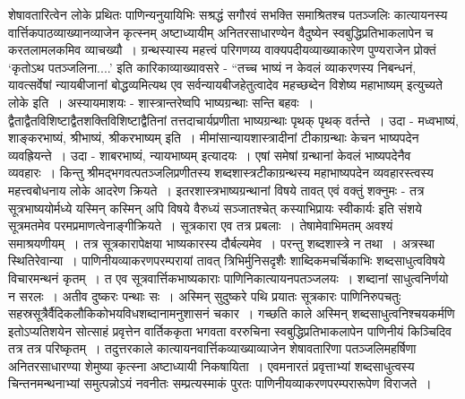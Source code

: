 {शेषावतारित्वेन लोके प्रथितः पाणिन्यनुयायिभिः सश्रद्धं सगौरवं सभक्ति समाश्रितश्च \-पतञ्जलिः कात्यायनस्य वार्त्तिकपाठव्याख्यानव्याजेन कृत्स्नम् अष्टाध्यायीम् अनितरसाधारण्येन \break वैदुष्येन स्वबुद्धिप्रतिभाकलापेन च करतलामलकमिव व्याचख्यौ~। ग्रन्थस्यास्य महत्त्वं परि\-गणय्य वाक्यपदीयव्याख्याकारेण पुण्यराजेन प्रोक्तं ‘कृतोऽथ पतञ्जलिना....’ इति कारिकाव्याख्यावसरे - “तच्च भाष्यं न केवलं व्याकरणस्य निबन्धनं, यावत्सर्वेषां न्यायबीजानां \-बोद्धव्यमित्यथ एव सर्वन्यायबीजहेतुत्वादेव महच्छब्देन विशेष्य महाभाष्यम् इत्युच्यते लोके इति~। अस्यायमाशयः - शास्त्रान्तरेष्वपि भाष्यग्रन्थाः सन्ति बहवः~। द्वैताद्वैतविशिष्टाद्वैत\-शक्तिविशिष्टाद्वैतिनां तत्तदाचार्यप्रणीता भाष्यग्रन्थाः पृथक् पृथक् वर्तन्ते~। उदा - मध्व\-भाष्यं, शाङ्करभाष्यं, श्रीभाष्यं, श्रीकरभाष्यम् इति~। मीमांसान्यायशास्त्रादीनां टीकाग्रन्थाः केचन \-भाष्यपदेन व्यवह्रियन्ते~। उदा - शाबरभाष्यं, न्यायभाष्यम् इत्यादयः~। एषां समेषां ग्रन्थानां केवलं भाष्यपदेनैव व्यवहारः~। किन्तु श्रीमद्भगवत्पतञ्जलिप्रणीतस्य शब्दशास्त्रटीकाग्रन्थस्य महाभाष्यपदेन व्यवहारस्त्वस्य महत्त्वबोधनाय लोके आदरेण क्रियते~। इतरशास्त्रभाष्य\-ग्रन्थानां विषये तावत् एवं वक्तुं शक्नुमः - तत्र सूत्रभाष्ययोर्मध्ये यस्मिन् कस्मिन् अपि विषये वैरुध्यं सञ्जातश्चेत् कस्याभिप्रायः स्वीकार्यः इति संशये सूत्रमतमेव परमप्रमाणत्वेनाङ्गीक्रियते~। सूत्र\-कारा एव तत्र प्रबलाः~। तेषामेवाभिमतम् अवश्यं समाश्रयणीयम्~। तत्र सूत्रकारापेक्षया \break भाष्यकारस्य दौर्बल्यमेव~। परन्तु शब्दशास्त्रे न तथा~। अत्रस्था स्थितिरेवान्या~। पाणिनीयव्याकरणपरम्परायां तावत् त्रिभिर्मुनिसदृशैः शाब्दिकमचर्चिकाभिः शब्दसाधुत्वविषये विचा\-रमन्थनं कृतम्~। त एव सूत्रवार्त्तिकभाष्यकाराः पाणिनिकात्यायनपतञ्जलयः~। शब्दानां \-साधुत्वनिर्णयो न सरलः~। अतीव दुष्करः पन्थाः सः~। अस्मिन् सुदुष्करे पथि प्रयातः \-सूत्रकारः पाणिनिरुपचतुः सहस्रसूत्रैर्वैदिकलौकिकोभयविधशब्दानामनुशासनं चकार~। गच्छति काले अस्मिन् शब्दसाधुत्वनिश्चयकर्मणि इतोऽप्यतिशयेन सोत्साहं प्रवृत्तेन वार्तिककृता भगवता वररुचिना स्वबुद्धिप्रतिभाकलापेन पाणिनीयं किञ्चिदिव तत्र तत्र परिष्कृतम्~। तदुत्तरकाले कात्यायनवार्त्तिकव्याख्याव्याजेन शेषावतारिणा पतञ्जलिमहर्षिणा अनितरसाधारण्या शेमुष्या कृत्स्ना अष्टाध्यायी निकषायिता~। एवमनारतं प्रवृत्ताभ्यां शब्दसाधुत्वस्य चिन्तनमन्थनाभ्यां समुत्पन्नोऽयं नवनीतः सम्प्रत्यस्माकं पुरतः पाणिनीयव्याकरणपरम्परारूपेण विराजते~। 
~\\[0.1cm]
}
